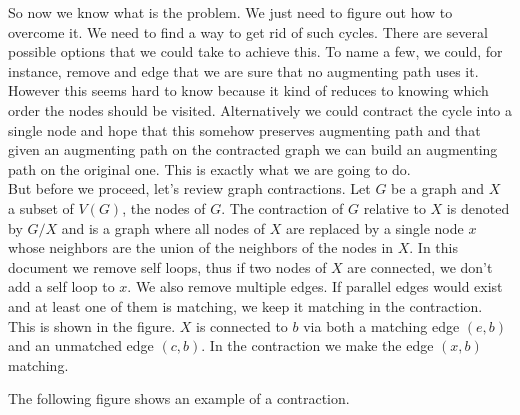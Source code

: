 \documentclass[a4paper,10pt]{article}
\begin{document}
So now we know what is the problem. We just need to figure out how to 
overcome it. We need to find a way to get rid of such cycles. 
There are several possible options that we could take to achieve this.
To name a few, we could, for instance, remove and edge that we are sure 
that no augmenting path uses it. However this seems hard to know because
it kind of reduces to knowing which order the nodes should be visited.
Alternatively we could contract the cycle into a single node and
hope that this somehow preserves augmenting path and that given an
augmenting path on the contracted graph we can build an augmenting
path on the original one. This is exactly what we are going to do. \\

But before we proceed, let's review graph contractions. Let $G$ be 
a graph and $X$ a subset of $V(G)$, the nodes of $G$. The contraction
of $G$ relative to $X$ is denoted by $G \slash X$ and is a graph where
all nodes of $X$ are replaced by a single node $x$ whose neighbors are the 
union of the neighbors of the nodes in $X$. In this document we remove
self loops, thus if two nodes of $X$ are connected, we don't add a 
self loop to $x$. We also remove multiple edges. If parallel edges would
exist and at least one of them is matching, we keep it matching
in the contraction. This is shown in the figure. $X$ is connected
to $b$ via both a matching edge $(e, b)$ and an unmatched
edge $(c, b)$. In the contraction we make the edge $(x, b)$
matching.

The following figure shows an example of a contraction.
\end{document}
